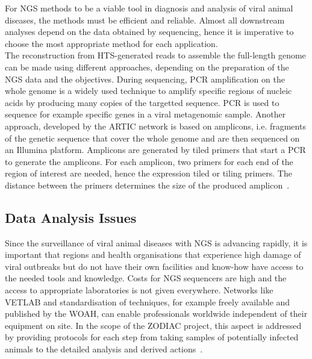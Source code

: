 For \ac{NGS} methods to be a viable tool in diagnosis and analysis of viral animal diseases, the methods must be efficient and reliable. Almost all downstream analyses depend on the data obtained by sequencing, hence it is imperative to choose the most appropriate method for each application. \\
The reconstruction from \ac{HTS}-generated reads to assemble the full-length genome can be made using different approaches, depending on the preparation of the \ac{NGS} data and the objectives. During sequencing, \ac{PCR} amplification on the whole genome is a widely used technique to amplify specific regions of nucleic acids by producing many copies of the targetted sequence. \ac{PCR} is used to sequence for example specific genes in a viral metagenomic sample. Another approach, developed by the ARTIC network is based on amplicons, i.e. fragments of the genetic sequence that cover the whole genome and are then sequenced on an Illumina platform. Amplicons are generated by tiled primers that start a \ac{PCR} to generate the amplicons. For each amplicon, two primers for each end of the region of interest are needed, hence the expression tiled or tiling primers. The distance between the primers determines the size of the produced amplicon~\cite{mamanova2010target}.

\subsection{Data Analysis Issues}
Since the surveillance of viral animal diseases with \ac{NGS} is advancing rapidly, it is important that regions and health organisations that experience high damage of viral outbreaks but do not have their own facilities and know-how have access to the needed tools and knowledge. Costs for \ac{NGS} sequencers are high and the access to appropriate laboratories is not given everywhere. Networks like \ac{VETLAB} and standardisation of techniques, for example freely available and published by the \ac{WOAH}, can enable professionals worldwide independent of their equipment on site. In the scope of the \ac{ZODIAC} project, this aspect is addressed by providing protocols for each step from taking samples of potentially infected animals to the detailed analysis and derived actions~\cite{zodiac2021}.

